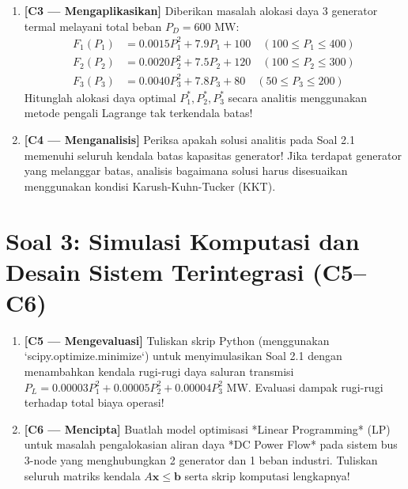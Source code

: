 \documentclass[11pt,a4paper]{article}
\begin{document}
\begin{enumerate}[label=\textbf{2.\arabic*}, leftmargin=*]
    \item \textbf{[C3 --- Mengaplikasikan]} Diberikan masalah alokasi daya 3 generator termal melayani total beban $P_D = 600\text{ MW}$:
    \begin{align*}
        F_1(P_1) &= 0.0015 P_1^2 + 7.9 P_1 + 100 \quad (100 \le P_1 \le 400) \\
        F_2(P_2) &= 0.0020 P_2^2 + 7.5 P_2 + 120 \quad (100 \le P_2 \le 300) \\
        F_3(P_3) &= 0.0040 P_3^2 + 7.8 P_3 + 80 \quad (50 \le P_3 \le 200)
    \end{align*}
    Hitunglah alokasi daya optimal $P_1^*, P_2^*, P_3^*$ secara analitis menggunakan metode pengali Lagrange tak terkendala batas!

    \item \textbf{[C4 --- Menganalisis]} Periksa apakah solusi analitis pada Soal 2.1 memenuhi seluruh kendala batas kapasitas generator! Jika terdapat generator yang melanggar batas, analisis bagaimana solusi harus disesuaikan menggunakan kondisi Karush-Kuhn-Tucker (KKT).
\end{enumerate}

\section*{Soal 3: Simulasi Komputasi dan Desain Sistem Terintegrasi (C5--C6)}

\begin{enumerate}[label=\textbf{3.\arabic*}, leftmargin=*]
    \item \textbf{[C5 --- Mengevaluasi]} Tuliskan skrip Python (menggunakan `scipy.optimize.minimize`) untuk menyimulasikan Soal 2.1 dengan menambahkan kendala rugi-rugi daya saluran transmisi $P_L = 0.00003 P_1^2 + 0.00005 P_2^2 + 0.00004 P_3^2\text{ MW}$. Evaluasi dampak rugi-rugi terhadap total biaya operasi!

    \item \textbf{[C6 --- Mencipta]} Buatlah model optimisasi *Linear Programming* (LP) untuk masalah pengalokasian aliran daya *DC Power Flow* pada sistem bus 3-node yang menghubungkan 2 generator dan 1 beban industri. Tuliskan seluruh matriks kendala $A \mathbf{x} \le \mathbf{b}$ serta skrip komputasi lengkapnya!
\end{enumerate}
\end{document}
